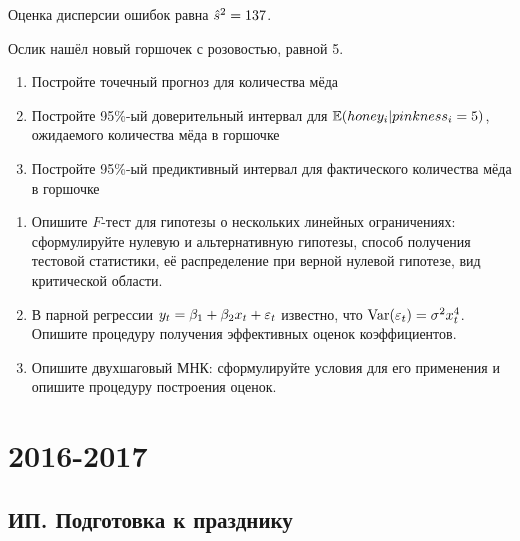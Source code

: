 \documentclass[12pt, a4paper]{article}
\begin{document}
\begin{enumerate}
Оценка дисперсии ошибок равна $\hat{s}^2 = 137$.

Ослик нашёл новый горшочек с розовостью, равной 5.

\begin{enumerate}
\item Постройте точечный прогноз для количества мёда
\item Постройте 95\%-ый доверительный интервал для $\mathbb{E}(honey_i | pinkness_i = 5)$, ожидаемого количества мёда в горшочке
\item Постройте 95\%-ый предиктивный интервал для фактического количества мёда в горшочке
\end{enumerate}


\end{enumerate}

\begin{enumerate}[resume]
\item Опишите $F$-тест для гипотезы о нескольких линейных ограничениях: сформулируйте нулевую и альтернативную гипотезы, способ получения тестовой статистики, её распределение при верной нулевой гипотезе, вид критической области.

\item В парной регрессии $y_t=\beta_1+ \beta_2 x_t+\varepsilon_t$ известно, что $\operatorname{Var}(\varepsilon_t) = \sigma^2 x_t^4$. Опишите процедуру получения эффективных оценок коэффициентов.

\item Опишите двухшаговый МНК: сформулируйте условия для его применения и опишите процедуру построения оценок.

\end{enumerate}

\section{2016-2017}

\subsection{ИП. Подготовка к празднику}
\end{document}
